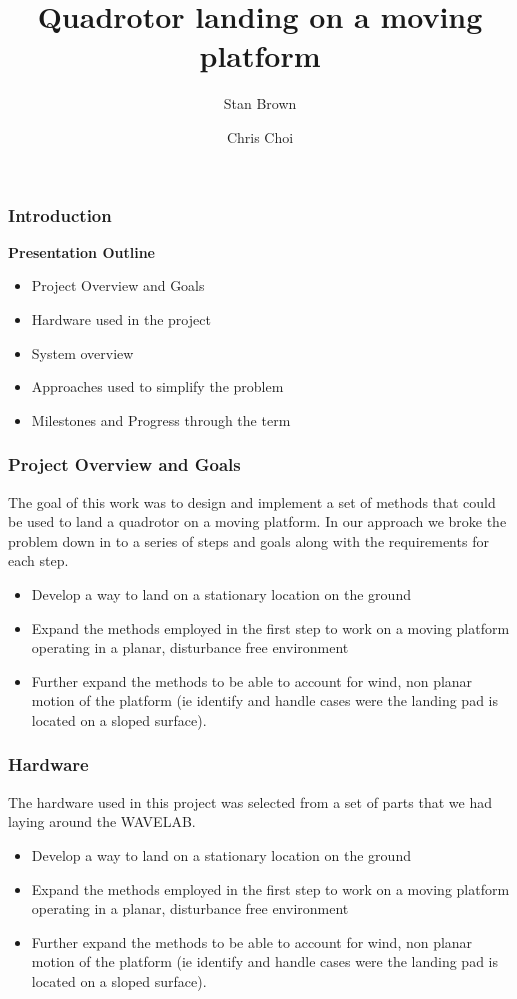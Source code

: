 \documentclass{beamer}
\begin{document}
\title{Quadrotor landing on a moving platform}
\subtitle{}
\author[]{Stan Brown \and Chris Choi}

\frame{\titlepage}

  \begin{frame}
    \frametitle{Introduction}
     \textbf{Presentation Outline}
     \begin{itemize}     
        \item Project Overview and Goals       
        \item Hardware used in the project
        \item System overview
        \item Approaches used to simplify the problem
        \item Milestones and Progress through the term       
    \end{itemize}
  \end{frame}
 
   \begin{frame}
    \frametitle{Project Overview and Goals}
     The goal of this work was to design and implement a set of methods that could be used 			to land a quadrotor on a moving platform. In our approach we broke the problem down 		in to a series of steps and goals along with the requirements for each step.
     \begin{itemize}     
        \item Develop a way to land on a stationary location on the ground
        \item Expand the methods employed in the first step to work on a moving platform 						operating in a planar, disturbance free environment
        \item Further expand the methods to be able to account for wind, non planar motion 					of the platform (ie identify and handle cases were the landing pad is 						located on a sloped surface).  
    \end{itemize}     
\end{frame}

 \begin{frame}
    \frametitle{Hardware}
     The hardware used in this project was selected from a set of parts that we had laying 			around the WAVELAB. 
     \begin{itemize}    
        \item Develop a way to land on a stationary location on the ground
        \item Expand the methods employed in the first step to work on a moving platform 						operating in a planar, disturbance free environment
        \item Further expand the methods to be able to account for wind, non planar motion 					of the platform (ie identify and handle cases were the landing pad is 						located on a sloped surface).  
    \end{itemize}     
\end{frame}
  


\end{document}
